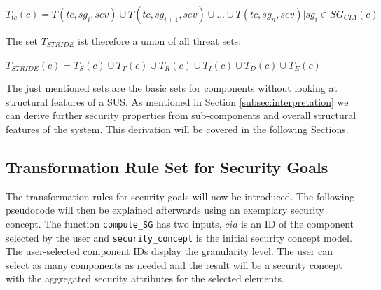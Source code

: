 \begin{theorem} 
$T_{tc}(c) = T(tc, sg_i, sev) \cup T(tc, sg_{i+1}, sev) \cup ... \cup T(tc, sg_n, sev) | sg_i \in SG_{CIA}(c)$
\end{theorem}

The set $T_{STRIDE}$ ist therefore a union of all threat sets:

\begin{theorem} 
$T_{STRIDE}(c) = T_S(c) \cup T_T(c) \cup T_R(c) \cup T_I(c) \cup T_D(c) \cup T_E(c)$
\end{theorem}

The just mentioned sets are the basic sets for components without looking at structural features of a SUS. As mentioned in Section \ref{subsec:interpretation} we can derive further security properties from sub-components and overall structural features of the system. This derivation will be covered in the following Sections.

\subsection{Transformation Rule Set for Security Goals}
\label{subsec:sec_goals_rules}

The transformation rules for security goals will now be introduced. The following pseudocode will then be explained afterwards using an exemplary security concept. The function  \texttt{compute\_SG} has two inputs, $cid$ is  an ID of the component selected by the user and \texttt{security\_concept} is the initial security concept model. The user-selected component IDs display the granularity level. The user can select as many components as needed and the result will be a security concept with the aggregated security attributes for the selected elements.

